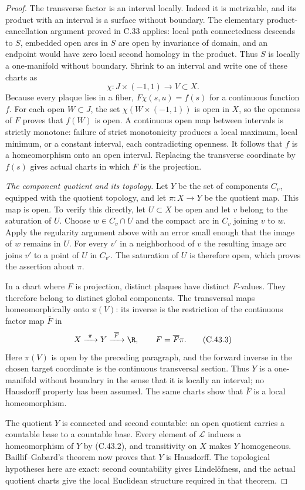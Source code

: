 \begin{proof}
The transverse factor is an interval locally.
Indeed it is metrizable, and its product with
an interval is a surface without boundary.
The elementary product-cancellation argument
proved in C.33 applies: local path connectedness
descends to $S$, embedded open arcs in $S$ are
open by invariance of domain, and an endpoint
would have zero local second homology in the
product. Thus $S$ is locally a one-manifold
without boundary. Shrink to an interval and
write one of these charts as
\[
 \chi:J\times(-1,1)\longrightarrow V\subset X.
\]
Because every plaque lies in a fiber,
$F\chi(s,u)=f(s)$ for a continuous function $f$.
For each open $W\subset J$, the set
$\chi(W\times(-1,1))$ is open in $X$, so the
openness of $F$ proves that $f(W)$ is open.
A continuous open map between intervals is
strictly monotone: failure of strict monotonicity
produces a local maximum, local minimum, or a
constant interval, each contradicting openness.
It follows that $f$ is a homeomorphism onto
an open interval. Replacing the transverse
coordinate by $f(s)$ gives actual charts
in which $F$ is the projection.

\emph{The component quotient and its topology.}
Let $Y$ be the set of components $C_v$, equipped
with the quotient topology, and let
$\pi:X\to Y$ be the quotient map.
This map is open. To verify this directly,
let $U\subset X$ be open and let $v$ belong
to the saturation of $U$. Choose
$w\in C_v\cap U$ and the compact arc in $C_v$
joining $v$ to $w$. Apply the regularity
argument above with an error small enough
that the image of $w$ remains in $U$.
For every $v'$ in a neighborhood of $v$
the resulting image arc joins $v'$ to a
point of $U$ in $C_{v'}$. The saturation
of $U$ is therefore open, which proves
the assertion about $\pi$.

In a chart where $F$ is projection, distinct
plaques have distinct $F$-values. They therefore
belong to distinct global components.
The transversal maps homeomorphically onto
$\pi(V)$: its inverse is the restriction
of the continuous factor map $\overline F$
in
\[
 X\xrightarrow{\ \pi\ }Y
   \xrightarrow{\ \overline F\ }\R,
 \qquad F=\overline F\pi.                               \tag{C.43.3}
\]
Here $\pi(V)$ is open by the preceding
paragraph, and the forward inverse in
the chosen target coordinate is the
continuous transversal section.
Thus $Y$ is a one-manifold without boundary
in the sense that it is locally an interval;
no Hausdorff property has been assumed.
The same charts show that $\overline F$
is a local homeomorphism.

The quotient $Y$ is connected and second
countable: an open quotient carries a
countable base to a countable base.
Every element of $\mathcal L$ induces a
homeomorphism of $Y$ by (C.43.2), and
transitivity on $X$ makes $Y$ homogeneous.
Baillif--Gabard's theorem
\cite[Theorem 1.1, proved in Section 4]
{C_BaillifGabard2008} now proves that
$Y$ is Hausdorff.
The topological hypotheses here are exact:
second countability gives Lindel\"ofness,
and the actual quotient charts give the
local Euclidean structure required in
that theorem.


\end{proof}
